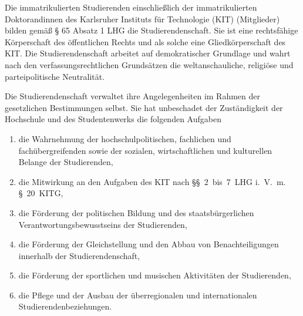 

\begin{jurdoc}
\setcounter{juratoclevel}{2}

%
%
Die immatrikulierten Studierenden einschließlich der immatrikulierten Doktorandinnen des Karlsruher Instituts für Technologie (KIT) (Mitglieder) bilden gemäß § 65 Absatz 1 LHG die Studierendenschaft. Sie ist eine rechtsfähige Körperschaft des öffentlichen Rechts und als solche eine Gliedkörperschaft des KIT. Die Studierendenschaft arbeitet auf demokratischer Grundlage und wahrt nach den verfassungsrechtlichen Grundsätzen die weltanschauliche, religiöse und parteipolitische Neutralität.


\label{studierendenschaft:aufgaben}

Die Studierendenschaft verwaltet ihre Angelegenheiten im Rahmen der gesetzlichen Bestimmungen selbst. Sie hat unbeschadet der Zuständigkeit der Hochschule und des Studentenwerks die folgenden Aufgaben
\begin{enumerate}
\item die Wahrnehmung der hochschulpolitischen, fachlichen und fachübergreifenden sowie der sozialen, wirtschaftlichen und kulturellen Belange der Studierenden,
\item die Mitwirkung an den Aufgaben des KIT nach §§~2~bis~7~LHG i.~V.~m. §~20~KITG,
\item die Förderung der politischen Bildung und des staatsbürgerlichen Verantwortungsbewusstseins der Studierenden,
\item die Förderung der Gleichstellung und den Abbau von Benachteiligungen innerhalb der Studierendenschaft,
\item die Förderung der sportlichen und musischen Aktivitäten der Studierenden,
\item die Pflege und der Ausbau der überregionalen und internationalen Studierendenbeziehungen.
\end{enumerate}

\label{studierendenschaft:mitglieder}


\end{jurdoc}
